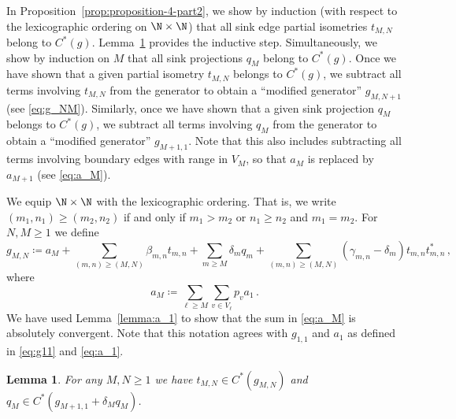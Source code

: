 \documentclass[12pt, a4paper]
{amsart}
\newtheorem{lemma}[thm]{Lemma}
\theoremstyle{definition}
\theoremstyle{remark}
\numberwithin{equation}{section}
\newcommand{\Cstar}{\ensuremath{C^*}}
\begin{document}
In Proposition~\ref{prop:proposition-4-part2}, we show by induction (with respect to the lexicographic ordering on $\N \times \N$) that all sink edge partial isometries $t_{M,N}$ belong to $\Cstar(g)$. Lemma~\ref{lemma:proposition-4-part1} provides the inductive step. Simultaneously, we show by induction on $M$ that all sink projections $q_M$ belong to $\Cstar(g)$. Once we have shown that a given partial isometry $t_{M,N}$ belongs to $\Cstar(g)$, we subtract all terms involving $t_{M,N}$ from the generator to obtain a ``modified generator'' $g_{M,N+1}$ (see \eqref{eq:g_NM}). Similarly, once we have shown that a given sink projection $q_M$ belongs to $\Cstar(g)$, we subtract all terms involving $q_{M}$ from the generator to obtain a ``modified generator'' $g_{M+1,1}$. Note that this also includes subtracting all terms involving boundary edges with range in $V_M$, so that $a_M$ is replaced by $a_{M+1}$ (see \eqref{eq:a_M}). 

\vspace{0.3cm}
We equip $\N \times \N$ with the lexicographic ordering. That is, we write $(m_1,n_1) \ge (m_2, n_2)$ if and only if $m_1 > m_2$ or $n_1 \ge n_2$ and $m_1 = m_2$. For $N,M \ge 1$ we define
\begin{equation}\label{eq:g_NM}
g_{M,N} \coloneq  a_M + \sum_{(m,n) \ge (M,N)} \beta_{m,n} t_{m,n} +  \sum_{m \ge M} \delta_m q_m + \sum_{(m,n) \ge (M,N)} (\gamma_{m,n}-\delta_m) t_{m,n}t_{m,n}^*\,,
\end{equation}
where
\begin{equation}\label{eq:a_M}
    a_M \coloneq \sum_{\ell \ge M}\sum_{v \in V_\ell}p_v a_1\,.
\end{equation}
We have used Lemma~\ref{lemma:a_1} to show that the sum in \eqref{eq:a_M} is absolutely convergent. Note that this notation agrees with $g_{1,1}$ and $a_1$ as defined in \eqref{eq:g11} and \eqref{eq:a_1}.

\begin{lemma}%
\label{lemma:proposition-4-part1}
    For any $M,N \ge 1$ we have $t_{M,N} \in \Cstar(g_{M,N})$ and $q_{M} \in \Cstar(g_{M+1,1} + \delta_M q_M)$.
\end{lemma}
\end{document}
